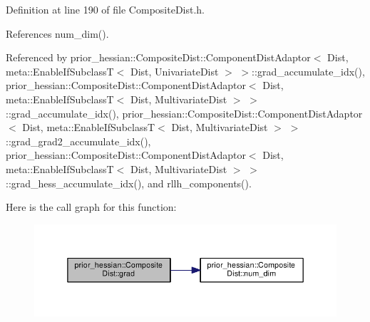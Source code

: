Definition at line 190 of file Composite\+Dist.\+h.



References num\+\_\+dim().



Referenced by prior\+\_\+hessian\+::\+Composite\+Dist\+::\+Component\+Dist\+Adaptor$<$ Dist, meta\+::\+Enable\+If\+Subclass\+T$<$ Dist, Univariate\+Dist $>$ $>$\+::grad\+\_\+accumulate\+\_\+idx(), prior\+\_\+hessian\+::\+Composite\+Dist\+::\+Component\+Dist\+Adaptor$<$ Dist, meta\+::\+Enable\+If\+Subclass\+T$<$ Dist, Multivariate\+Dist $>$ $>$\+::grad\+\_\+accumulate\+\_\+idx(), prior\+\_\+hessian\+::\+Composite\+Dist\+::\+Component\+Dist\+Adaptor$<$ Dist, meta\+::\+Enable\+If\+Subclass\+T$<$ Dist, Multivariate\+Dist $>$ $>$\+::grad\+\_\+grad2\+\_\+accumulate\+\_\+idx(), prior\+\_\+hessian\+::\+Composite\+Dist\+::\+Component\+Dist\+Adaptor$<$ Dist, meta\+::\+Enable\+If\+Subclass\+T$<$ Dist, Multivariate\+Dist $>$ $>$\+::grad\+\_\+hess\+\_\+accumulate\+\_\+idx(), and rllh\+\_\+components().



Here is the call graph for this function\+:\nopagebreak
\begin{figure}[H]
\begin{center}
\leavevmode
\includegraphics[width=350pt]{classprior__hessian_1_1CompositeDist_aaa6bfd95f5914c0f68d67cd97ff40db3_cgraph}
\end{center}
\end{figure}





